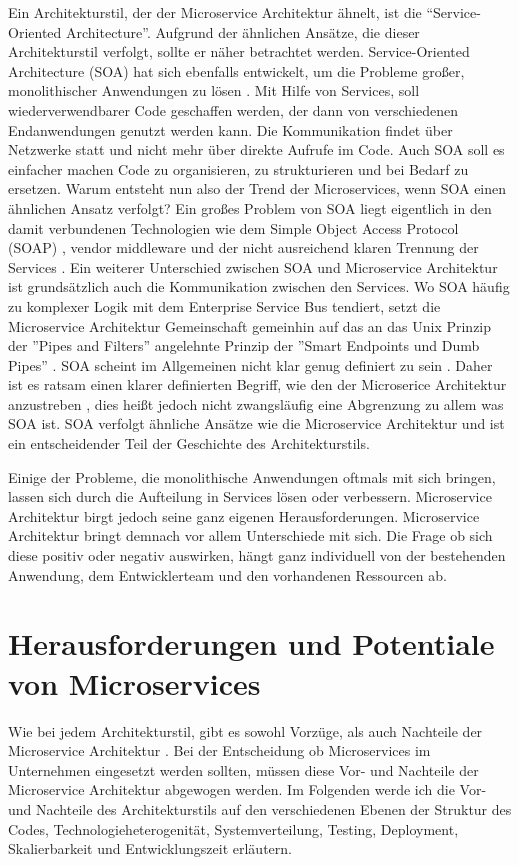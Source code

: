 Ein Architekturstil, der der Microservice Architektur ähnelt, ist die ``Service-Oriented Architecture''. Aufgrund der ähnlichen Ansätze, die dieser Architekturstil verfolgt, sollte er näher betrachtet werden.
Service-Oriented Architecture (SOA) hat sich ebenfalls entwickelt, um die Probleme großer, monolithischer Anwendungen zu lösen \cite[][Seite 8]{newman2015building}. Mit Hilfe von Services, soll wiederverwendbarer Code geschaffen werden, der dann von verschiedenen Endanwendungen genutzt werden kann. Die Kommunikation findet über Netzwerke statt und nicht mehr über direkte Aufrufe im Code. Auch SOA soll es einfacher machen Code zu organisieren, zu strukturieren und bei Bedarf zu ersetzen. Warum entsteht nun also der Trend der Microservices, wenn SOA einen ähnlichen Ansatz verfolgt? Ein großes Problem von SOA liegt eigentlich in den damit verbundenen Technologien wie dem Simple Object Access Protocol (SOAP) \cite{soap}, vendor middleware und der nicht ausreichend klaren Trennung der Services \cite[][Seite 8]{newman2015building}.
Ein weiterer Unterschied zwischen SOA und Microservice Architektur ist grundsätzlich auch die Kommunikation zwischen den Services. Wo SOA häufig zu komplexer Logik mit dem Enterprise Service Bus \cite[][]{esb} tendiert, setzt die Microservice Architektur Gemeinschaft gemeinhin auf das an das Unix Prinzip der ''Pipes and Filters'' \cite[vgl.][]{microsoft:pipes} angelehnte Prinzip der ''Smart Endpoints und Dumb Pipes'' \cite[vgl.][]{Fowler:Intro}.
SOA scheint im Allgemeinen nicht klar genug definiert zu sein \cite[vgl.][]{Fowler:Intro}. Daher ist es ratsam einen klarer definierten Begriff, wie den der Microserice Architektur anzustreben \cite[][]{Fowler:Intro}, dies heißt jedoch nicht zwangsläufig eine Abgrenzung zu allem was SOA ist. SOA verfolgt ähnliche Ansätze wie die Microservice Architektur und ist ein entscheidender Teil der Geschichte des Architekturstils.

Einige der Probleme, die monolithische Anwendungen oftmals mit sich bringen, lassen sich durch die Aufteilung in Services lösen oder verbessern. Microservice Architektur birgt jedoch seine ganz eigenen Herausforderungen. Microservice Architektur bringt demnach vor allem Unterschiede mit sich. Die Frage ob sich diese positiv oder negativ auswirken, hängt ganz individuell von der bestehenden Anwendung, dem Entwicklerteam und den vorhandenen Ressourcen ab.

\section{Herausforderungen und Potentiale von Microservices}
Wie bei jedem Architekturstil, gibt es sowohl Vorzüge, als auch Nachteile der Microservice Architektur \cite[vgl.][]{Fowler:Guide}.
Bei der Entscheidung ob Microservices im Unternehmen eingesetzt werden sollten, müssen diese Vor- und Nachteile der Microservice Architektur abgewogen werden.
Im Folgenden werde ich die Vor- und Nachteile des Architekturstils auf den verschiedenen Ebenen der Struktur des Codes, Technologieheterogenität, Systemverteilung, Testing, Deployment, Skalierbarkeit und Entwicklungszeit erläutern.

